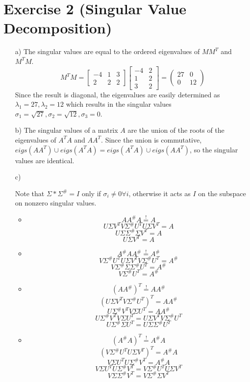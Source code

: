 \documentclass[10pt]{article}
\numberwithin{equation}{section}
\begin{document}
\section*{Exercise 2 (Singular Value Decomposition)}
\begin{enumerate}
\item[a)]{
    The singular values are equal to the ordered eigenvalues of $MM^T$ and $M^TM$.
    $$M^TM = \begin{bmatrix}-4&1&3\\ 2&2&2\end{bmatrix}\begin{bmatrix}-4&2\\ 1&2 \\3&2\end{bmatrix} = \begin{pmatrix}27 & 0\\ 0&12\end{pmatrix}$$
    Since the result is diagonal, the eigenvalues are easily determined as $\lambda_1=27, \lambda_2=12$ which results in the singular values $\sigma_1 = \sqrt{27}, \sigma_2 = \sqrt{12}, \sigma_3 = 0$.
  }
\item[b)]{
    The singular values of a matrix $A$ are the union of the roots of the eigenvalues of $A^TA$ and $AA^T$. Since the union is commutative, $eigs(AA^T) \cup eigs(A^TA) = eigs(A^TA) \cup eigs(AA^T)$, so the singular values are identical.
  }
\item[c)]{
    Note that $\Sigma * \Sigma^\# = I$ only if $\sigma_i \neq 0 \forall i$, otherwise it acts as $I$ on the subspace on nonzero singular values.
    \begin{itemize}
      \item{
        $$AA^\#A \overset{!}= A$$
        $$U\Sigma V^T V \Sigma^\# U^T U\Sigma V^T = A$$
        $$U\Sigma \Sigma^\# \Sigma V^T = A$$
        $$U \Sigma V^T = A$$
      }
    \item{
        $$A^\# A A^\# \overset{!}{=} A^\#$$
        $$V\Sigma^\# U^T U\Sigma V^T V\Sigma^\# U^T = A^\#$$
        $$V\Sigma^\# \Sigma \Sigma^\# U^T = A^\#$$
        $$V\Sigma^\# U^T = A^\#$$
  
      }
    \item{
        $$(A A^\#)^T \overset{!}{=} A A^\#$$
        $$(U\Sigma V^T V \Sigma^\# U^T)^T = A A^\#$$
        $$U\Sigma^\# V^T V \Sigma U^T = A A^\# $$
        $$U\Sigma^\# V^T V \Sigma U^T = U\Sigma V^T V \Sigma^\# U^T $$
        $$U\Sigma^\# \Sigma U^T = U\Sigma \Sigma^\# U^T $$
      }
    \item{
        $$(A^\# A)^T \overset{!}{=} A^\# A$$
        $$(V\Sigma^\# U^T U \Sigma V^T)^T = A^\# A$$
        $$V\Sigma U^T U \Sigma^\# V^T = A^\# A$$
        $$V\Sigma U^T U \Sigma^\# V^T = V\Sigma^\# U^T U \Sigma V^T $$
        $$V\Sigma \Sigma^\# V^T = V\Sigma^\# \Sigma V^T $$
      }
    \end{itemize}
}
\end{enumerate}
\end{document}
